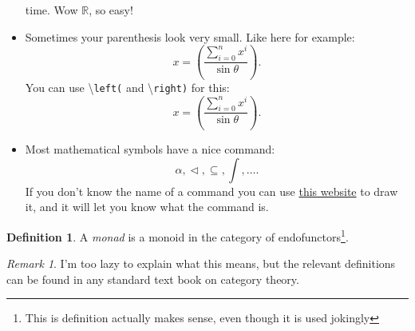\documentclass{article}
\theoremstyle{plain}
\theoremstyle{definition}
\newtheorem{definition}[theorem]{Definition}
\theoremstyle{remark}
\newtheorem{remark}[theorem]{Remark}
\newcommand{\R}{\mathbb{R}}
\begin{document}
\begin{itemize}
	      time. Wow $\R$, so easy!
	\item Sometimes your parenthesis look very small. Like here for example:
	      \begin{equation*}
		      x= (\frac{\sum_{i=0}^n x^i}{\sin \theta}).
	      \end{equation*}
	      You can use \textbackslash \texttt{left(} and \textbackslash \texttt{right)} for this:
	      \begin{equation*}
		      x= \left(\frac{\sum_{i=0}^n x^i}{\sin \theta}\right).
	      \end{equation*}
	\item Most mathematical symbols have a nice command:
	      \begin{equation*}
		      \alpha, \vartriangleleft, \subseteq, \int, \dots.
	      \end{equation*}
	      If you don't know the name of a command you can use \href{http://detexify.kirelabs.org/classify.html}{this website} to draw it, and it will let you know what the command is.
\end{itemize}

\begin{definition}
	A \emph{monad} is a monoid in the category of endofunctors\footnote{This is definition actually makes sense, even though it is used jokingly}.
\end{definition}
\begin{remark}
	I'm too lazy to explain what this means, but the relevant definitions can be found in any standard text book on category theory.
\end{remark}



\end{document}
